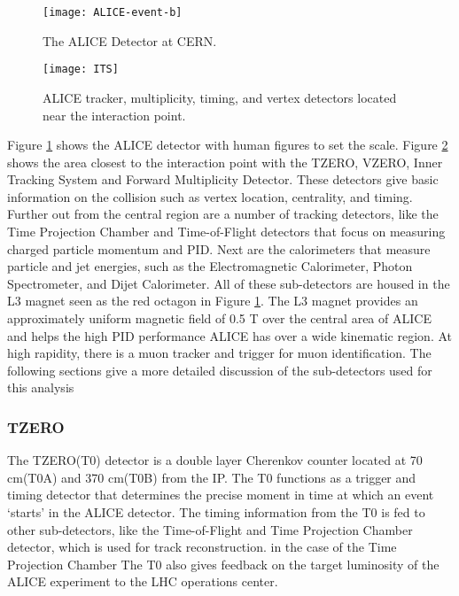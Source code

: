 \begin{figure}[h!]
\texttt{[image: ALICE-event-b]}
\centering
\caption{The ALICE Detector at CERN\cite{Alberico:2011zy}.}
 \label{fig:alice}
\end{figure}

\begin{figure}[h!]
\texttt{[image: ITS]}
\centering
\caption{ALICE tracker, multiplicity, timing, and vertex detectors located near the interaction point\cite{Alberico:2011zy}.}
 \label{fig:ITS}
\end{figure}


Figure \ref{fig:alice} shows the ALICE detector with human figures to set the scale.  Figure \ref{fig:ITS} shows the area closest to the interaction point with the TZERO, VZERO, Inner Tracking System and Forward Multiplicity Detector.  These detectors give basic information on the collision such as vertex location, centrality, and timing.   Further out from the central region are a number of tracking detectors, like the Time Projection Chamber and Time-of-Flight detectors that focus on  measuring charged particle momentum and PID.  Next are the calorimeters that measure particle and jet energies, such as the Electromagnetic Calorimeter, Photon Spectrometer, and  Dijet Calorimeter.  All of these sub-detectors are housed in the L3 magnet seen as the red octagon in Figure \ref{fig:alice}.   The L3 magnet provides an approximately uniform magnetic field of 0.5 T over the central area of ALICE and helps the high PID performance ALICE has over a wide kinematic region\cite{Gligorov:2018vkc}.  At high rapidity, there is a muon tracker and trigger for muon identification.  The following sections give a more detailed discussion of the sub-detectors used for this analysis

\subsubsection{TZERO}
The TZERO(T0)\cite{Bondila:2005xy} detector is a double layer Cherenkov counter located at 70 cm(T0A) and 370 cm(T0B) from the IP.  The T0 functions as a trigger and timing detector that determines the precise moment in time at which an event `starts' in the ALICE detector.  The timing information from the T0 is fed to other sub-detectors, like the Time-of-Flight and Time Projection Chamber detector, which is used for track reconstruction. in the case of the Time Projection Chamber  The T0 also gives feedback on the target luminosity of the ALICE experiment to the LHC operations center.  

